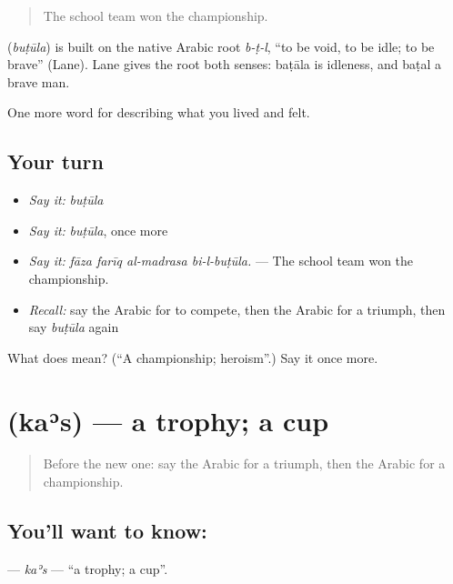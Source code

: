 \begin{quote}
The school team won the championship.
\end{quote}

\begin{cousinweb}
\textbf{} (\emph{buṭūla}) is built on the native Arabic root \emph{b-ṭ-l}, \textquotedblleft{}to be void, to be idle; to be brave\textquotedblright{} (Lane). Lane gives the root both senses: baṭāla is idleness, and baṭal a brave man.
\end{cousinweb}

\begin{grammarlens}[title={What you've built}]
One more word for describing what you lived and felt.
\end{grammarlens}

\subsection*{Your turn}
\begin{itemize}
\raggedright
  \item \emph{Say it:} \emph{buṭūla}
  \item \emph{Say it:} \emph{buṭūla}, once more
  \item \emph{Say it:} \emph{fāza farīq al-madrasa bi-l-buṭūla.} — The school team won the championship.
  \item \emph{Recall:} say the Arabic for to compete, then the Arabic for a triumph, then say \emph{buṭūla} again
\end{itemize}

\begin{tcolorbox}[breakable,colback=teal!4,colframe=teal!35!black,title={Before you move on}]
What does  mean? (\textquotedblleft{}A championship; heroism\textquotedblright{}.) Say it once more.
\end{tcolorbox}
\section[\texorpdfstring{\ar{كأس} (kaʾs)}{كأس (kaʾs)}]{ (kaʾs) — a trophy; a cup}

\label{lesson:AR-C547-kas}



\begin{quote}
Before the new one: say the Arabic for a triumph, then the Arabic for a championship.
\end{quote}

\subsection*{You'll want to know: }
\textbf{} — \emph{kaʾs} — \textquotedblleft{}a trophy; a cup\textquotedblright{}.

